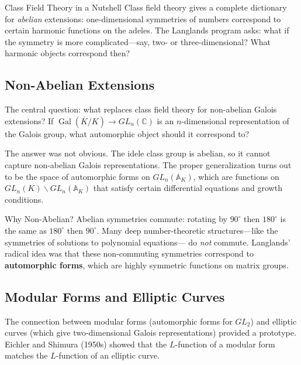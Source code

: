 \begin{knowledgebridge}{Class Field Theory in a Nutshell}
Class field theory gives a complete dictionary for \emph{abelian}
extensions: one-dimensional symmetries of numbers correspond to
certain harmonic functions on the adeles. The Langlands program
asks: what if the symmetry is more complicated---say, two- or
three-dimensional? What harmonic objects correspond then?
\end{knowledgebridge}

\subsection{Non-Abelian Extensions}

The central question: what replaces class field theory for non-abelian Galois extensions? If $\operatorname{Gal}(\overline{K}/K) \to GL_n(\mathbb{C})$ is an $n$-dimensional representation of the Galois group, what automorphic object should it correspond to?

The answer was not obvious. The idele class group is abelian, so it cannot capture non-abelian Galois representations. The proper generalization turns out to be the space of automorphic forms on $GL_n(\mathbb{A}_K)$, which are functions on $GL_n(K) \backslash GL_n(\mathbb{A}_K)$ that satisfy certain differential equations and growth conditions.

\begin{knowledgebridge}{Why Non-Abelian?}
Abelian symmetries commute: rotating by $90^\circ$ then $180^\circ$
is the same as $180^\circ$ then $90^\circ$. Many deep number-theoretic
structures---like the symmetries of solutions to polynomial equations---
do \emph{not} commute. Langlands' radical idea was that these
non-commuting symmetries correspond to \textbf{automorphic forms},
which are highly symmetric functions on matrix groups.
\end{knowledgebridge}

\subsection{Modular Forms and Elliptic Curves}

The connection between modular forms (automorphic forms for $GL_2$) and elliptic curves (which give two-dimensional Galois representations) provided a prototype. Eichler and Shimura (1950s) showed that the $L$-function of a modular form matches the $L$-function of an elliptic curve.

